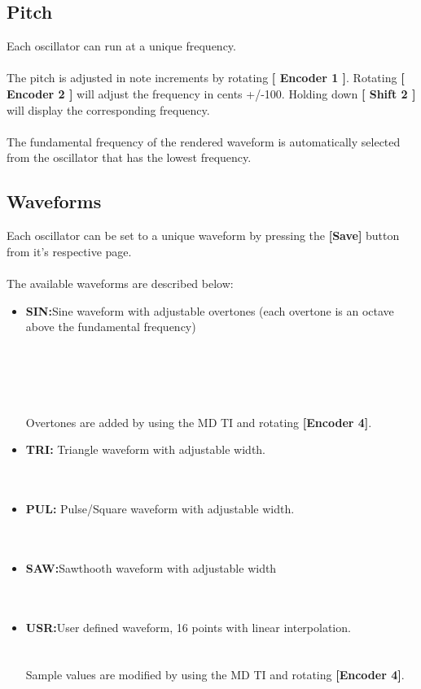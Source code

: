 \subsection{Pitch}
Each oscillator can run at a unique frequency.\\
\\The pitch is adjusted in note increments by rotating \textbf{[ Encoder 1 ]}. Rotating \textbf{[ Encoder 2 ]} will adjust the frequency in cents +/-100. Holding down \textbf{[ Shift 2 ]} will display the corresponding frequency.\\
\\The fundamental frequency of the rendered waveform is automatically selected from the oscillator that has the lowest frequency.
\subsection{Waveforms}
Each oscillator can be set to a unique waveform by pressing the \textbf{[Save]} button from it's respective page.\\
\\
The available waveforms are described below:

\begin{itemize}
\item{\textbf{SIN:}}Sine waveform with adjustable overtones (each overtone is an octave above the fundamental frequency)\\
\\\\
\\\\
\\Overtones are added by using the MD TI and rotating \textbf{[Encoder 4]}.
\item{\textbf{TRI:}} Triangle waveform with adjustable width.\\
\\\\
\item{\textbf{PUL:}} Pulse/Square waveform with adjustable width.\\
\\\\
\item{\textbf{SAW:}}Sawthooth waveform with adjustable width\\
\\\\
\item{\textbf{USR:}}User defined waveform, 16 points with linear interpolation.\\
\\\\
Sample values are modified by using the MD TI and rotating \textbf{[Encoder 4]}.
\end{itemize}
